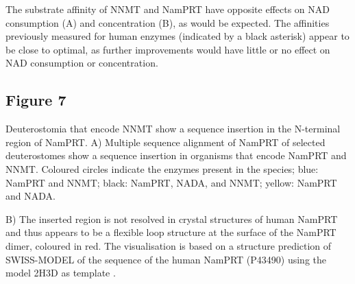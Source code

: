 The substrate affinity of NNMT and NamPRT have opposite effects on NAD consumption (A) and concentration (B), as would be expected. The affinities previously measured for human enzymes (indicated by a black asterisk) appear to be close to optimal, as further improvements would have little or no effect on NAD consumption or concentration.


\subsection{Figure 7}

Deuterostomia that encode NNMT show a sequence insertion in the N-terminal region of NamPRT. A) Multiple sequence alignment of NamPRT of selected deuterostomes show a sequence insertion in organisms that encode NamPRT and NNMT. Coloured circles indicate the enzymes present in the species; blue: NamPRT and NNMT; black: NamPRT, NADA, and NNMT; yellow: NamPRT and NADA.

B) The inserted region is not resolved in crystal structures of human NamPRT and thus appears to be a flexible loop structure at the surface of the NamPRT dimer, coloured in red. The visualisation is based on a structure prediction of SWISS-MODEL \cite{Arnold2006,Biasini2014} of the sequence of the human NamPRT (P43490) using the model 2H3D as template \cite{Wang2006}.
